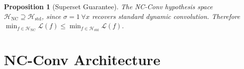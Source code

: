 \documentclass{bmvc2k}
\newtheorem{proposition}{Proposition}
\begin{document}
\begin{proposition}[Superset Guarantee]
The NC-Conv hypothesis space $\mathcal{H}_{\text{NC}} \supseteq \mathcal{H}_{\text{std}}$, since $\sigma = 1\ \forall x$ recovers standard dynamic convolution. Therefore $\min_{f \in \mathcal{H}_{\text{NC}}} \mathcal{L}(f) \leq \min_{f \in \mathcal{H}_{\text{std}}} \mathcal{L}(f)$.
\end{proposition}


\section{NC-Conv Architecture}
\label{sec:method}
\end{document}
